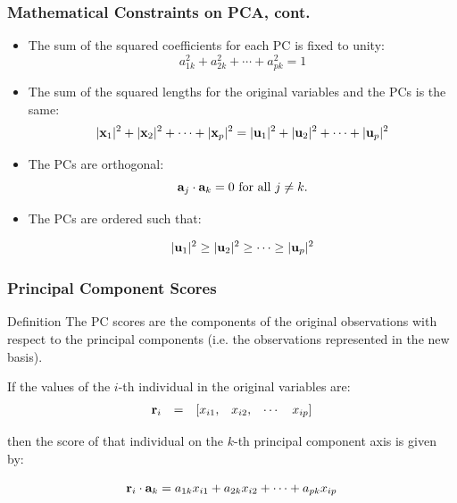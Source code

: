 \documentclass{beamer}
\begin{document}
\begin{frame}
  \frametitle{Mathematical Constraints on PCA, cont.}


\begin{itemize}
	\item The sum of the squared coefficients for each PC is fixed to unity:
\[
a_{1k}^2 + a_{2k}^2 + \cdots + a_{pk}^2 = 1
\]

	\item The sum of the squared lengths for the original variables and the PCs is the same:
\[
|\mathbf{x}_1|^2 + |\mathbf{x}_2|^2 + \cdots + |\mathbf{x}_p|^2 = |\mathbf{u}_1|^2 + |\mathbf{u}_2|^2 + \cdots + |\mathbf{u}_p|^2
\]	

	\item The PCs are orthogonal:
\[
\mathbf{a}_j \cdot \mathbf{a}_k = 0 \mbox{ for all } j \neq k.
\]

	\item The PCs are ordered such that:

\[
 |\mathbf{u}_1|^2 \geq |\mathbf{u}_2|^2  \geq \cdots \geq |\mathbf{u}_p|^2
\]

\end{itemize}

\end{frame}



\begin{frame}
  \frametitle{Principal Component Scores}

\begin{block}{Definition}
The PC scores are the components of the original observations with respect to the principal components (i.e. the observations represented in the new basis).
\end{block}
\medskip

If the values of the $i$-th individual in the original variables are:
\[
\begin{array}{cccccc}
\mathbf{r}_i & = & [x_{i1}, & x_{i2}, & \cdots & x_{ip}]
\end{array}
\]

then the score of that individual on the $k$-th principal component axis is given by:

\[
\mathbf{r}_i \cdot \mathbf{a}_k = a_{1k}x_{i1} + a_{2k}x_{i2} + \cdots + a_{pk}x_{ip}
\]

\end{frame}
\end{document}
